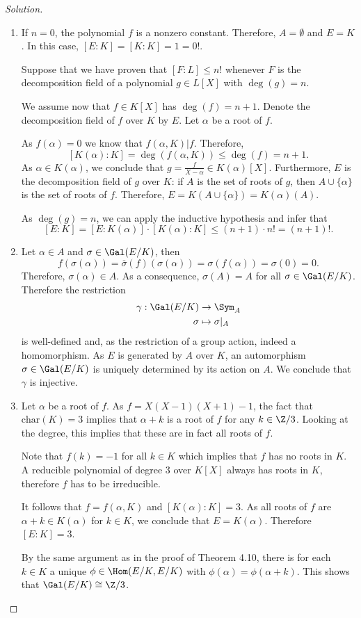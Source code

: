 \documentclass[a4paper,10pt,reqno]{amsart}
\newenvironment{sol}
  {\renewcommand\qedsymbol{$\blacksquare$}\begin{proof}[Solution]}
  {\end{proof}}
\begin{document}
\begin{sol}~

 \begin{enumerate}[label=(\roman*)]
    \item If $n = 0$, the polynomial $f$ is a nonzero constant. Therefore, $A = \emptyset$ and $E = K$. In this case, $[E:K] = [K:K] = 1 = 0!$.

    Suppose that we have proven that $[F:L] \leq n!$ whenever $F$ is the decomposition field of a polynomial $g \in L[X]$ with $\deg(g) = n$.
    
    We assume now that $f \in K[X]$ has $\deg(f) = n+1$. Denote the decomposition field of $f$ over $K$ by $E$. Let $\alpha$ be a root of $f$.

    As $f(\alpha) = 0$ we know that $f(\alpha,K)| f$. Therefore,
   \[
    [K(\alpha):K] = \deg(f(\alpha,K)) \leq \deg(f) = n+1.
    \]
    As $\alpha \in K(\alpha)$, we conclude that $g = \frac{f}{X-\alpha} \in K(\alpha)[X]$. Furthermore, $E$ is the decomposition field of $g$ over $K$: if $A$ is the set of roots of $g$, then $A \cup \{\alpha \}$ is the set of roots of $f$. Therefore, $E = K(A \cup \{ \alpha \}) = K(\alpha)(A)$.
    
     As $\deg(g) = n$, we can apply the inductive hypothesis and infer that
     \[
     [E:K] = [E:K(\alpha)] \cdot [K(\alpha):K] \leq (n+1) \cdot n! = (n+1)!.
    \]
     \item Let $\alpha \in A$ and $\sigma \in \Gal(E/K)$, then
    \[
    f(\sigma(\alpha)) = \overline{\sigma}(f) (\sigma(\alpha)) = \sigma(f(\alpha)) = \sigma(0) = 0.
     \]
     Therefore, $\sigma(\alpha) \in A$. As a consequence, $\sigma(A) = A$ for all $\sigma \in \Gal(E/K)$.
     Therefore the restriction
     \begin{align*}
     \gamma: \Gal(E/K) & \to \Sym_A \\
     \sigma & \mapsto \sigma |_A
     \end{align*}
    is well-defined and, as the restriction of a group action, indeed a homomorphism. As $E$ is generated by $A$ over $K$, an automorphism $\sigma \in \Gal(E/K)$ is uniquely determined by its action on $A$. We conclude that $\gamma$ is injective.
     \item Let $\alpha$ be a root of $f$. As $f = X(X-1)(X+1) -1$, the fact that $\mathrm{char}(K) = 3$ implies that $\alpha + k$ is a root of $f$ for any $k \in \Z/3$. Looking at the degree, this implies that these are in fact all roots of $f$.

     Note that $f(k) = -1$ for all $k \in K$ which implies that $f$ has no roots in $K$. A reducible polynomial of degree $3$ over $K[X]$ always has roots in $K$, therefore $f$ has to be irreducible.

     It follows that $f = f(\alpha,K)$ and $[K(\alpha):K] = 3$. As all roots of $f$  are $\alpha + k \in K(\alpha)$ for $k \in K$, we conclude that $E = K(\alpha)$. Therefore $[E:K] = 3$.

    By the same argument as in the proof of Theorem 4.10, there is for each $k \in K$ a unique $\phi \in \Hom(E/K,E/K)$ with $\phi(\alpha) = \phi(\alpha+k)$. This shows that $\Gal(E/K) \cong \Z/3$.\qedhere
     \end{enumerate}
 \end{sol}
\end{document}
